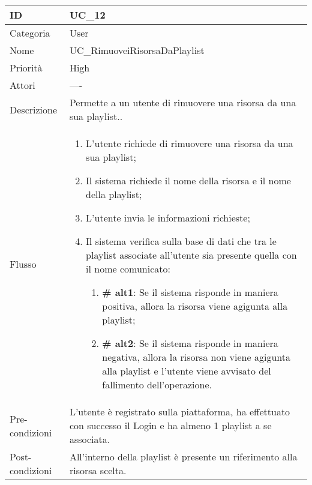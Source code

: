 \begin{center}
\begin{tabular}{ |p{2cm}|p{13cm}|  }
\hline
ID & UC\_12 \\\hline
Categoria & User\\\hline
Nome & UC\_RimuoveiRisorsaDaPlaylist\\\hline
Priorità & High \\\hline
Attori &  ---- \\\hline
Descrizione & Permette a un utente di rimuovere una risorsa da una sua playlist..\\\hline
Flusso &  	\begin{enumerate}
			\item L'utente richiede di rimuovere una risorsa da una sua playlist;
			\item Il sistema richiede il nome della risorsa e il nome della playlist;
			\item L'utente invia le informazioni richieste;
			\item Il sistema verifica sulla base di dati che tra le playlist associate all'utente sia presente quella con il nome comunicato:
			\begin{enumerate}[  ]
				\item \textbf{\# alt1}: Se il sistema risponde in maniera positiva, allora la risorsa viene agigunta alla playlist;
				\item \textbf{\# alt2}: Se il sistema risponde in maniera negativa, allora la risorsa non viene  agigunta alla playlist e l'utente viene avvisato del fallimento dell'operazione.
			\end{enumerate}
		\end{enumerate}\\\hline
Pre-condizioni & L'utente è registrato sulla piattaforma, ha effettuato con successo il Login e ha almeno 1 playlist a se associata.\\\hline
Post-condizioni & All'interno della playlist è presente un riferimento alla risorsa scelta.\\\hline
\end{tabular}
\label{table_use_case:12}\newline


\end{center}

